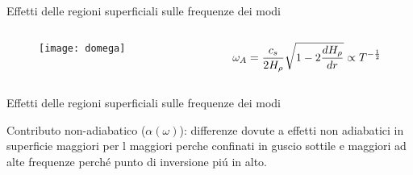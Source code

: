 \documentclass[10pt,xcolor={usenames},fleqn,mathserif,serif]{beamer}
\begin{document}
\begin{frame}{Effetti delle regioni superficiali sulle frequenze dei modi}

\begin{columns}

\begin{column}{0.5\textwidth}

\begin{figure}
\texttt{[image: domega]}
\end{figure}

\end{column}

\begin{column}{0.5\textwidth}
%
\begin{align*}
&\omega_A=\frac{c_s}{2H_{\rho}{}}\sqrt{1-2\frac{d H_{\rho}{}}{d r}}\propto T^{-\frac{1}{2}}
\end{align*}


\end{column}

\end{columns}

\end{frame}

\begin{wordonframe}{Effetti delle regioni superficiali sulle frequenze dei modi}

Contributo non-adiabatico ($\alpha(\omega)$): differenze dovute a effetti non adiabatici in superficie maggiori per l maggiori perche confinati in guscio sottile e maggiori ad alte frequenze perch\'e punto di inversione pi\'u in alto.

\end{wordonframe}
\end{document}
